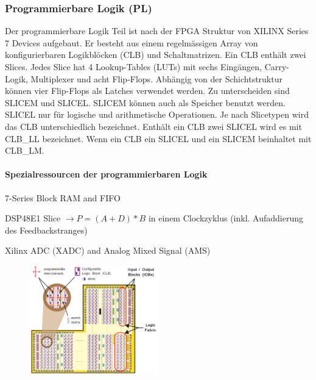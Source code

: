 \subsubsection{Programmierbare Logik (PL)}
\begin{multicols}{2}
    Der programmierbare Logik Teil ist nach der FPGA Struktur von XILINX Series 7 Devices aufgebaut. Er besteht aus einem regelmässigen Array von konfigurierbaren Logikblöcken (CLB) und Schaltmatrizen. Ein CLB enthält zwei Slices. Jedes Slice hat 4 Lookup-Tables (LUTs) mit sechs Eingängen, Carry-Logik, Multiplexer und acht Flip-Flops. Abhängig von der Schichtstruktur können vier Flip-Flops als Latches verwendet werden. Zu unterscheiden sind SLICEM und SLICEL. SLICEM können auch als Speicher benutzt werden. SLICEL nur für logische und arithmetische Operationen. Je nach Slicetypen wird das CLB unterschiedlich bezeichnet. Enthält ein CLB zwei SLICEL wird es mit CLB\_LL bezeichnet. Wenn ein CLB ein SLICEL und ein SLICEM beinhaltet mit CLB\_LM.
    \paragraph{Spezialressourcen der programmierbaren Logik}
    \begin{compactitem}
        \item 7-Series Block RAM and FIFO
        \item DSP48E1 Slice $\rightarrow P=(A+D)*B$ in einem Clockzyklus (inkl. Aufaddierung des Feedbackstranges)
        \item Xilinx ADC (XADC) and Analog Mixed Signal (AMS)
    \end{compactitem}
    \begin{figure}[H]
     	\includegraphics[width=0.5\textwidth]{images/Aufbau_PL.png}
    \end{figure}
    \ \\
\end{multicols}

